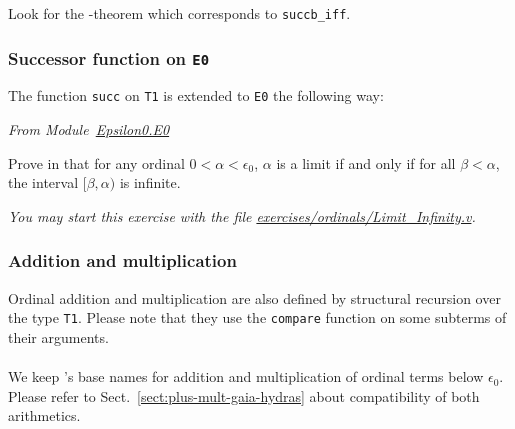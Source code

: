 \vspace{4pt}



\begin{exercise}[\gaiasign]
  Look for the \gaia-theorem which corresponds to \texttt{succb\_iff}.
\end{exercise}

\subsubsection{Successor function on \texttt{E0}}

The function \texttt{succ} on \texttt{T1} is extended to \texttt{E0} the following way:

 \emph{From Module~\href{../theories/html/hydras.Epsilon0.E0.html}{Epsilon0.E0}}


 
 \begin{exercise}
Prove in \coq{} that for any ordinal $0< \alpha<\epsilon_0$, $\alpha$ is a limit if 
and only if for all $\beta<\alpha$, the interval $[\beta,\alpha)$ is
infinite.

\emph{You may start this exercise with the file
     \href{https://github.com/coq-community/hydra-battles/tree/master/exercises/ordinals/Limit_Infinity.v}{exercises/ordinals/Limit\_Infinity.v}.}
 \end{exercise}

 
  
\subsubsection{Addition and multiplication}

Ordinal addition and multiplication are also defined by structural recursion over the type \texttt{T1}. Please note that they use the \texttt{compare} function on some subterms of their arguments.

\label{sect:infix-plus-T1}





\paragraph*{\gaiasign}
We keep \gaia's base names for
addition and multiplication of ordinal terms below $\epsilon_0$.
Please refer to Sect.~\ref{sect:plus-mult-gaia-hydras} about compatibility of both arithmetics.

